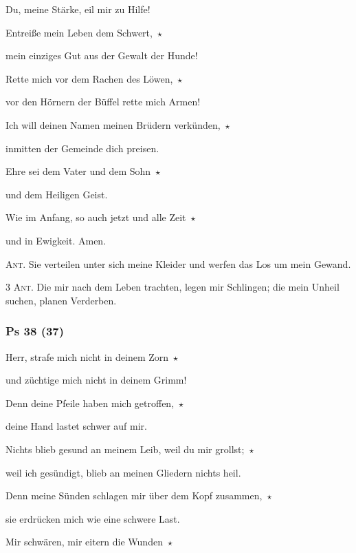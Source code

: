 Du, meine Stärke, eil mir zu Hilfe!
 
\noindent Entreiße mein Leben dem Schwert,~$\star$~\nopagebreak

mein einziges Gut aus der Gewalt der Hunde!
 
\noindent Rette mich vor dem Rachen des Löwen,~$\star$~\nopagebreak

vor den Hörnern der Büffel rette mich Armen!
 
\noindent Ich will deinen Namen meinen Brüdern verkünden,~$\star$~\nopagebreak

inmitten der Gemeinde dich preisen.

\noindent Ehre sei dem Vater und dem Sohn~$\star$~\nopagebreak

und dem Heiligen Geist.

\noindent Wie im Anfang, so auch jetzt und alle Zeit~$\star$~\nopagebreak

und in Ewigkeit. Amen.

\vspace{10pt}

\noindent \textsc{Ant.} Sie verteilen unter sich meine Kleider und werfen das Los um mein Gewand.

\vspace{10pt}

\noindent \textsc{3 Ant.} Die mir nach dem Leben trachten, legen mir Schlingen; die mein Unheil suchen, planen Verderben.

\subsubsection{Ps 38 (37)}

Herr, strafe mich nicht in deinem Zorn~$\star$~\nopagebreak

und züchtige mich nicht in deinem Grimm!
 
\noindent Denn deine Pfeile haben mich getroffen,~$\star$~\nopagebreak

deine Hand lastet schwer auf mir.
 
\noindent Nichts blieb gesund an meinem Leib, weil du mir grollst;~$\star$~\nopagebreak

weil ich gesündigt, blieb an meinen Gliedern nichts heil.
 
\noindent Denn meine Sünden schlagen mir über dem Kopf zusammen,~$\star$~\nopagebreak

sie erdrücken mich wie eine schwere Last.
 
\noindent Mir schwären, mir eitern die Wunden~$\star$~\nopagebreak


